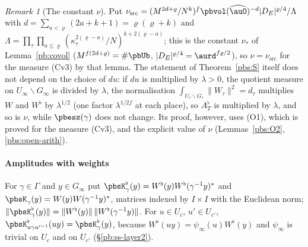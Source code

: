 \documentclass[10pt]{amsart}
\theoremstyle{definition}
\theoremstyle{remark}
\newtheorem{remark}[theorem]{Remark}
\begin{document}
\begin{remark}[The constant $\nu$]\label{pbs:rem-nu}
Put $\nu_{\mathrm{src}}=(M^{2d+\varrho}/N^k)^f\pbvol(\widehat\auO)^{-d}|D_E|^{\varrho/4}/\Lambda$
with $d=\sum_{a<\varrho}(2a+k+1)=\varrho(\varrho+k)$ and $\Lambda=\prod_\tau\prod_{a\le\varrho}
(\kappa_\tau^{2(\varrho-a)}/N)^{k+2(\varrho-a)}$; this is the constant $\nu_*$ of Lemma~\ref{pb:covol}
($M^{f(2d+\varrho)}=\#\pbUb$, $|D_E|^{\varrho/4}=\aurd^{f\varrho/2}$), so $\nu=\nu_{\mathrm{src}}$ for the
measure (Cv3) by that lemma. The statement of Theorem~\ref{pbs:S} itself does not depend on the
choice of $du$: if $du$ is multiplied by $\lambda>0$, the quotient measure on $U_\infty\backslash G_\infty$ is
divided by $\lambda$, the normalisation $\int_{U_\tau\backslash G_\tau}\|W_\tau\|^2=d_\tau$ multiplies
$W$ and $W^\flat$ by $\lambda^{1/2}$ (one factor $\lambda^{1/2f}$ at each place), so $A^\flat_T$ is
multiplied by $\lambda$, and so is $\nu$, while $\pbesz(\gamma)$ does not change. Its proof, however,
uses (O1), which is proved for the measure (Cv3), and the explicit value of $\nu$
(Lemmas~\ref{pbs:O2}, \ref{pbs:open-arith}).
\end{remark}

\paragraph*{Amplitudes with weights}
For $\gamma\in\Gamma$ and $y\in G_\infty$ put $\pbsK^\flat_\gamma(y)=W^\flat(y)W^\flat(\gamma^{-1}y)
^*$ and $\pbsK_\gamma(y)=W(y)W(\gamma^{-1}y)^*$, matrices indexed by $I\times I$ with the Euclidean
norm; $\|\pbsK^\flat_\gamma(y)\|=\|W^\flat(y)\|\,\|W^\flat(\gamma^{-1}y)\|$. For $u\in U_c$, $u'\in
U_{c'}$, $\pbsK^\flat_{u\gamma u'^{-1}}(uy)=\pbsK^\flat_\gamma(y)$, because $W^\flat(uy)=\psi_\infty(u)
W^\flat(y)$ and $\psi_\infty$ is trivial on $U_c$ and on $U_{c'}$ (\S\ref{pb:ss-layer2}).
\end{document}
